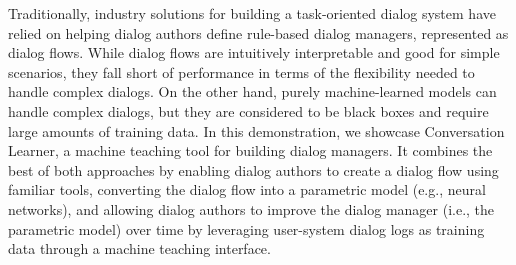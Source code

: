 Traditionally, industry solutions for building a task-oriented dialog system have relied on helping dialog authors define rule-based dialog managers, represented as dialog flows. While dialog flows are intuitively interpretable and good for simple scenarios, they fall short of performance in terms of the flexibility needed to handle complex dialogs. On the other hand, purely machine-learned models can handle complex dialogs, but they are considered to be black boxes and require large amounts of training data. In this demonstration, we showcase Conversation Learner, a machine teaching tool for building dialog managers. It combines the best of both approaches by enabling dialog authors to create a dialog flow using familiar tools, converting the dialog flow into a parametric model (e.g., neural networks), and allowing dialog authors to improve the dialog manager (i.e., the parametric model) over time by leveraging user-system dialog logs as training data through a machine teaching interface.
